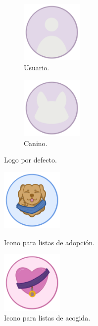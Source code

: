 \documentclass[a4paper, 12pt]{article}
\begin{document}
\begin{figure}[H]
   	\begin{subfigure}{0.48\textwidth}
		\begin{center}
			{\includegraphics[width=3cm]{logo/EMPTYUSER.png}\par}
			\caption{Usuario.}
		\end{center}  
	\end{subfigure}\hfill
   	\begin{subfigure}{0.48\textwidth}
		\begin{center}
			{\includegraphics[width=3cm]{logo/EMPTYDOG.png}\par}
			\caption{Canino.}
		\end{center}  
	\end{subfigure}\hfill
	\caption{Logo por defecto.}
\end{figure}


\begin{figure}[H]
   	\begin{minipage}{0.48\textwidth}
		\begin{center}
			{\includegraphics[width=3cm]{logo/Adoptar.png}\par}
			\caption{Icono para listas de adopción.}
		\end{center}  
	\end{minipage}\hfill
   	\begin{minipage}{0.48\textwidth}
		\begin{center}
			{\includegraphics[width=3cm]{logo/Acoger.png}\par}
			\caption{Icono para listas de acogida.}
		\end{center}  
	\end{minipage}\hfill
\end{figure}
\end{document}
